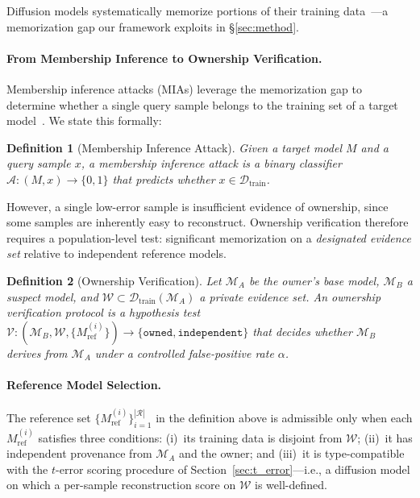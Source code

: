 \documentclass{article}
\newtheorem{definition}{Definition}
\begin{document}
Diffusion models systematically memorize portions of their training 
data~\citep{carlini2023extracting, somepalli2023diffusion}---a 
memorization gap our framework exploits in §\ref{sec:method}.

\paragraph{From Membership Inference to Ownership Verification.}
Membership inference attacks (MIAs) leverage the memorization gap
to determine whether a single query sample belongs to the training
set of a target model~\cite{duan2023diffusion, kong2024efficient}.
We state this formally:

\begin{definition}[Membership Inference Attack]
Given a target model $M$ and a query sample $x$, a
membership inference attack is a binary classifier
$\mathcal{A}: (M, x) \rightarrow \{0, 1\}$ that predicts
whether $x \in \mathcal{D}_{\mathrm{train}}$.
\end{definition}

However, a single low-error sample is insufficient evidence of 
ownership, since some samples are inherently easy to reconstruct. 
Ownership verification therefore requires a population-level test: 
significant memorization on a \emph{designated evidence set} 
relative to independent reference models.

\begin{definition}[Ownership Verification]
Let $\mathcal{M}_A$ be the owner's base model, $\mathcal{M}_B$ a 
suspect model, and $\mathcal{W} \subset \mathcal{D}_{\mathrm{train}}(\mathcal{M}_A)$ 
a private evidence set. An ownership verification protocol is a 
hypothesis test 
$\mathcal{V}: (\mathcal{M}_B, \mathcal{W}, \{M_{\text{ref}}^{(i)}\}) 
\rightarrow \{\texttt{owned}, \texttt{independent}\}$ 
that decides whether $\mathcal{M}_B$ derives from $\mathcal{M}_A$ 
under a controlled false-positive rate $\alpha$.
\end{definition}

\paragraph{Reference Model Selection.}
The reference set $\{M_{\text{ref}}^{(i)}\}_{i=1}^{|\mathcal{R}|}$ in the definition above is admissible only when each $M_{\text{ref}}^{(i)}$ satisfies three conditions: (i)~its training data is disjoint from $\mathcal{W}$;%
(ii)~it has independent provenance from $\mathcal{M}_A$ and the owner;%
and (iii)~it is type-compatible with the $t$-error scoring procedure of Section~\ref{sec:t_error}---i.e., a diffusion model on which a per-sample reconstruction score on $\mathcal{W}$ is well-defined.
\end{document}

